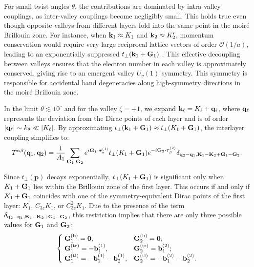 For small twist angles \(\theta\), the contributions are dominated by intra-valley couplings, as inter-valley couplings become negligibly small. This holds true even though opposite valleys from different layers fold into the same point in the moiré Brillouin zone. For instance, when \({\vb{k}}_1 \approx K_1\) and \({\vb{k}}_2 \approx K_2'\), momentum conservation would require very large reciprocal lattice vectors of order \(\mathcal{O}(1/a)\), leading to an exponentially suppressed \(t_\perp\qty({\vb{k}}_1 + {\vb{G}}_1)\) \cite{zou2018, thesis_angeli}. This effective decoupling between valleys ensures that the electron number in each valley is approximately conserved, giving rise to an emergent valley \(U_v(1)\) symmetry. This symmetry is responsible for accidental band degeneracies along high-symmetry directions in the moiré Brillouin zone.

In the limit \( \theta \lesssim 10^\circ \) and for the valley $\zeta = +1$, we expand \({\vb{k}}_\ell = K_\ell + {\vb{q}}_\ell\), where \({\vb{q}}_\ell\) represents the deviation from the Dirac points of each layer and is of order \(\abs{{\vb{q}}_\ell} \sim k_\theta \ll \abs{K_{\ell}}\). By approximating \(t_\perp({\vb{k}}_1 + {\vb{G}}_1) \approx t_\perp(K_1 + {\vb{G}}_1)\), the interlayer coupling simplifies to:
\begin{equation} \label{eq:interlayer-hopping-truncation}
T^{\alpha\beta}({\vb{q}}_1, {\vb{q}}_2) = \frac{1}{A_{1}} \sum_{{\vb{G}}_1, {\vb{G}}_2} e^{i {\vb{G}}_1 \cdot {\bm{\tau}}_{\alpha}^{(1)}}
t_{\perp}(K_1 + {\vb{G}}_1) e^{-i {\vb{G}}_2 \cdot {\bm{\tau}}_{\beta}^{(2)}}
\delta_{{\vb{q}}_2 - {\vb{q}}_1, {\vb{K}}_1 - {\vb{K}}_2 + {\vb{G}}_1 - {\vb{G}}_2}.
\end{equation}

Since \( t_\perp(\mathbf{p}) \) decays exponentially, \( t_\perp(K_1 + {\vb{G}}_1) \) is significant only when \( K_1 + {\vb{G}}_1 \) lies within the Brillouin zone of the first layer. This occurs if and only if \( K_1 + {\vb{G}}_1 \) coincides with one of the symmetry-equivalent Dirac points of the first layer: \( K_1 \), \( C_{3z} K_1 \), or \( C_{3z}^2 K_1 \). Due to the presence of the term \( \delta_{{\vb{q}}_2 - {\vb{q}}_1, {\vb{K}}_1 - {\vb{K}}_2 + {\vb{G}}_1 - {\vb{G}}_2} \), this restriction implies that there are only three possible values for \( {\vb{G}}_1 \) and \( {\vb{G}}_2 \):
\begin{align} \label{eq:G1G2_3_possibilities}
\begin{cases}
\; {\vb{G}}_1^{(\text{b})} = {\vb{0}},                      & {\vb{G}}_2^{(\text{b})} = {\vb{0}}; \\
\; {\vb{G}}_1^{(\text{tr})} = -{\vb{b}}_1^{(1)},            & {\vb{G}}_2^{(\text{tr})} = {\vb{b}}_1^{(2)}; \\
\; {\vb{G}}_1^{(\text{tl})} = -{\vb{b}}_1^{(1)}-{\vb{b}}_2^{(1)}, & {\vb{G}}_2^{(\text{tl})} = -{\vb{b}}_1^{(2)}-{\vb{b}}_2^{(2)}.
\end{cases}
\end{align}


